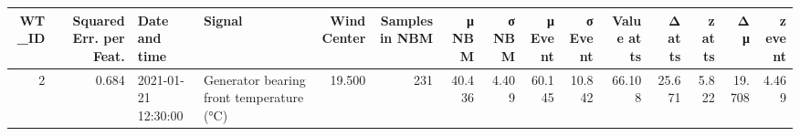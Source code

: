 \begin{tabular}{rrllrrrrrrrrrrr}
\toprule
WT\_ID & Squared Err. per Feat. & Date and time & Signal & Wind Center & Samples in NBM & μ NBM & σ NBM & μ Event & σ Event & Value at ts & Δ at ts & z at ts & Δ μ & z event \\
\midrule
2 & 0.684 & 2021-01-21 12:30:00 & Generator bearing front temperature (°C) & 19.500 & 231 & 40.436 & 4.409 & 60.145 & 10.842 & 66.108 & 25.671 & 5.822 & 19.708 & 4.469 \\
\bottomrule
\end{tabular}
